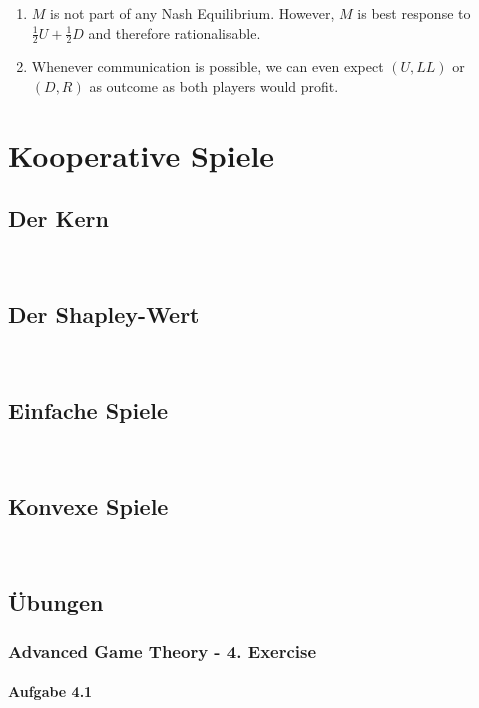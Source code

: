 \documentclass[12pt]{extreport} %
\theoremstyle{named}
\theoremstyle{itshape}
\theoremstyle{normal}
\begin{document}
\begin{enumerate}
\begin{proof}[Proof (Using the Proposition after the Definition of Mixed Strategy NE)]
\begin{itemize}
					\item For the remaining cases four cases the proof follows analogously; we find the necessary probability and show that deviation is enlarging the utility.
				\end{itemize}
			\end{proof}
	\item $M$ is not part of any Nash Equilibrium. However, $M$ is best response to $\frac{1}{2} U + \frac{1}{2}D$ and therefore rationalisable.
	\item Whenever communication is possible, we can even expect $(U, LL)$ or $(D, R)$ as outcome as both players would profit.
\end{enumerate}

\chapter{Kooperative Spiele}

\section{Der Kern}

~\newpage

\section{Der Shapley-Wert}

~\newpage

\section{Einfache Spiele}

~\newpage

\section{Konvexe Spiele}

~\newpage

\section{Übungen}

\subsection*{Advanced Game Theory - 4. Exercise}

\subsubsection*{Aufgabe 4.1}
\end{document}
